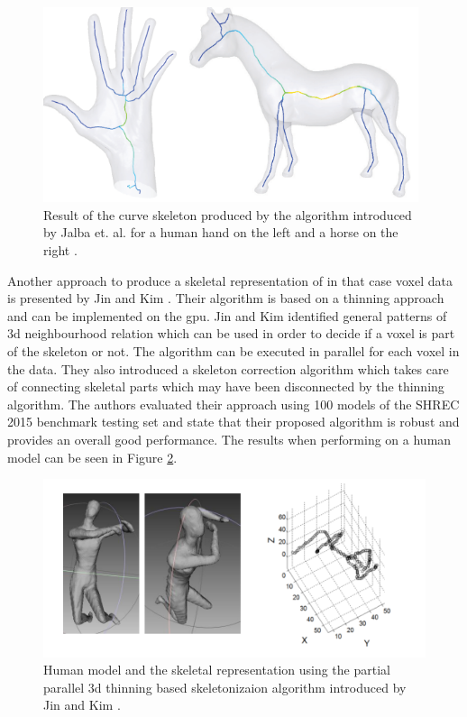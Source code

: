 \begin{figure} [htb!]
    \centering
	\includegraphics[width=11cm]{content/images/curveSkeletonJalba}
	\caption{Result of the curve skeleton produced by the algorithm introduced by Jalba et. al. for a human hand on the left and a horse on the right \cite{Jalba2013}.}
	\label{fig:CurveSkeleton}
\end{figure}

\newpage
Another approach to produce a skeletal representation of in that case voxel data is presented by Jin and Kim \cite{Jin2017}. Their algorithm is based on a thinning approach and can be implemented on the \gls{gpu}. Jin and Kim identified general patterns of \gls{3d} neighbourhood relation which can be used in order to decide if a voxel is part of the skeleton or not. The algorithm can be executed in parallel for each voxel in the data. They also introduced a skeleton correction algorithm which takes care of connecting skeletal parts which may have been disconnected by the thinning algorithm. The authors evaluated their approach using 100 models of the SHREC 2015 benchmark testing set and state that their proposed algorithm is robust and provides an overall good performance. The results when performing on a human model can be seen in Figure \ref{fig:skeletonThinning}.

\begin{figure} [htb!]
    \centering
	\includegraphics[width=14cm]{content/images/skeletonThinning}
	\caption{Human model and the skeletal representation using the partial parallel \gls{3d} thinning based skeletonizaion algorithm introduced by Jin and Kim \cite{Jin2017}.}
	\label{fig:skeletonThinning}
\end{figure}

